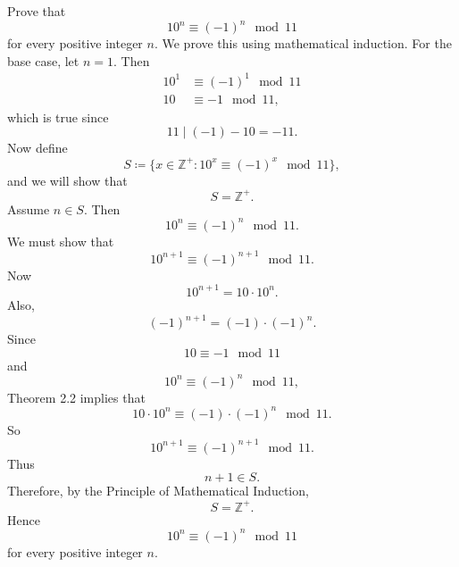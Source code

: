\begin{problem}{
    Prove that
    \[
        10^n\equiv (-1)^n\mod {11}
    \]
    for every positive integer $n$.
}
    We prove this using mathematical induction.
    For the base case, let $n=1$.
    Then
    \begin{align*}
        10^1 &\equiv (-1)^1\mod {11}\\
        10 &\equiv -1\mod {11},
    \end{align*}
    which is true since
    \[
        11\mid (-1)-10=-11.
    \]
    Now define
    \[
        S\coloneqq \{x\in\mathbb{Z}^+ : 10^x\equiv(-1)^x\mod {11}\},
    \]
    and we will show that
    \[
        S=\mathbb{Z}^+.
    \]
    Assume $n\in S$.
    Then
    \[
        10^n\equiv (-1)^n\mod {11}.
    \]
    We must show that
    \[
        10^{n+1}\equiv (-1)^{n+1}\mod {11}.
    \]
    Now
    \[
        10^{n+1}=10\cdot 10^n.
    \]
    Also,
    \[
        (-1)^{n+1}=(-1)\cdot (-1)^n.
    \]
    Since
    \[
        10\equiv -1\mod {11}
    \]
    and
    \[
        10^n\equiv (-1)^n\mod {11},
    \]
    Theorem 2.2 implies that
    \[
        10\cdot 10^n\equiv (-1)\cdot (-1)^n\mod {11}.
    \]
    So
    \[
        10^{n+1}\equiv (-1)^{n+1}\mod {11}.
    \]
    Thus
    \[
        n+1\in S.
    \]
    Therefore, by the Principle of Mathematical Induction,
    \[
        S=\mathbb{Z}^+.
    \]
    Hence
    \[
        10^n\equiv (-1)^n\mod {11}
    \]
    for every positive integer $n$.
\end{problem}

